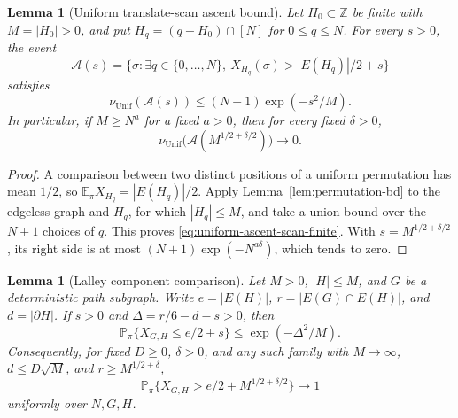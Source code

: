 \documentclass[11pt]{article}
\numberwithin{equation}{section}
\newtheorem{lemma}[theorem]{Lemma}
\theoremstyle{definition}
\theoremstyle{remark}
\newcommand{\E}{\mathbb E}
\newcommand{\Pp}{\mathbb P}
\newcommand{\Unif}{\mathrm{Unif}}
\newcommand{\nuUnif}{\nu_{\Unif}}
\newcommand{\1}{\mathbf 1}
\begin{document}
\begin{lemma}[Uniform translate-scan ascent bound]
\label{lem:uniform-ascent}
Let \(H_0\subset\mathbb Z\) be finite with \(M=|H_0|>0\),
and put \(H_q=(q+H_0)\cap[N]\) for \(0\le q\le N\).
For every \(s>0\), the event
\[
  \mathcal A(s)=
  \{\sigma:\exists q\in\{0,\ldots,N\},\
          X_{H_q}(\sigma)>|E(H_q)|/2+s\}
\]
satisfies
\begin{equation}
\label{eq:uniform-ascent-scan-finite}
  \nuUnif(\mathcal A(s))\le (N+1)\exp(-s^2/M).
\end{equation}
In particular, if \(M\ge N^a\) for a fixed \(a>0\), then for
every fixed \(\delta>0\),
\[
  \nuUnif\bigl(\mathcal A(M^{1/2+\delta/2})\bigr)\longrightarrow0.
\]
\end{lemma}

\begin{proof}
A comparison between two distinct positions of a uniform permutation
has mean \(1/2\), so \(\E_\pi X_{H_q}=|E(H_q)|/2\).
Apply Lemma~\ref{lem:permutation-bd} to the edgeless graph and
\(H_q\), for which \(|H_q|\le M\), and take a union bound over
the \(N+1\) choices of \(q\).  This proves
\eqref{eq:uniform-ascent-scan-finite}.  With
\(s=M^{1/2+\delta/2}\), its right side is at most
\((N+1)\exp(-N^{a\delta})\), which tends to zero.
\end{proof}

\begin{lemma}[Lalley component comparison]
\label{lem:lalley-comparison}
Let \(M>0\), \(|H|\le M\), and \(G\) be a deterministic
path subgraph.  Write \(e=|E(H)|\),
\(r=|E(G)\cap E(H)|\), and \(d=|\partial H|\).
If \(s>0\) and \(\Delta=r/6-d-s>0\), then
\begin{equation}
\label{eq:lalley-comparison-finite}
  \Pp_\pi\{X_{G,H}\le e/2+s\}
  \le\exp(-\Delta^2/M).
\end{equation}
Consequently, for fixed \(D\ge0\), \(\delta>0\), and any such
family with \(M\to\infty\), \(d\le D\sqrt M\), and
\(r\ge M^{1/2+\delta}\),
\[
  \Pp_\pi\{X_{G,H}>e/2+M^{1/2+\delta/2}\}\longrightarrow1
\]
uniformly over \(N,G,H\).
\end{lemma}
\end{document}
